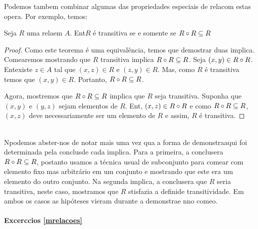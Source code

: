 Podemos tambem combinar algumas das propriedades especiais de rela\coes com estas opera\cois. Por exemplo, temos:
\begin{teob}
Seja $R$ uma rela\cao em $A$. Ent\ao $R$ \'e transitiva se e somente se $R\circ R\subseteq R$
\end{teob}
\begin{proof}
Como este teorema \'e uma equival\^encia, temos que demostrar duas implica\cois. Come\cc aremos mostrando que $R$ transitiva implica $R\circ R\subseteq R$. Seja $(x,y)\in R\circ R$. Ent\ao existe $z\in A$ tal que $(x,z)\in R$ e $(z,y)\in R$. Mas, como $R$ \'e transitiva temos que $(x,y)\in R$. Portanto, $R\circ R\subseteq R$.

Agora, mostremos que $R\circ R\subseteq R$ implica que $R$ seja transitiva. Suponha que $(x,y)$ e $(y,z)$ sejam elementos de $R$. Ent\aoi, $(x,z)\in R\circ R$ e como $R\circ R\subseteq R$, $(x,z)$ deve necessariamente ser um elemento de $R$ e assim, $R$ \'e transitiva. 
\end{proof}
\\

N\ao podemos abster-nos de notar mais uma vez qua a forma de demonstra\cao aqui foi determinada pela conclus\ao de cada implica\caoi. Para a primeira, a conclus\ao era $R\circ R\subseteq R$, postanto usamos a t\'ecnica usual de subconjunto para come\cc ar com elemento fixo mas arbitr\'ario em um conjunto e mostrando que este era um elemento do outro conjunto. Na segunda implica\cao, a conclus\ao era que $R$ seria transitiva, neste caso, mostramos que $R$ stisfazia a defini\cao de transitividade. Em ambos os casos as hip\'oteses vieram durante a demonstra\cao e n\ao no come\cc o.

\paragraph{Excerc\ih cios \ref{mrelacoes}}

